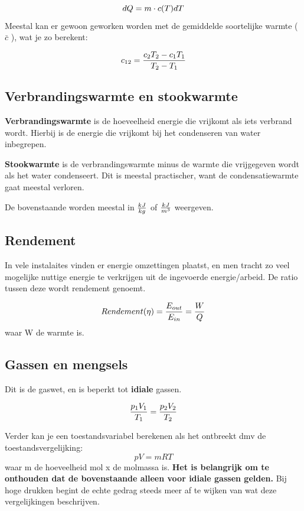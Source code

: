 \documentclass[12pt]{extarticle} %
\begin{document}
\begin{equation}\label{eq:warmte DE}
    dQ = m \cdot c(T) dT \\
    \end{equation}
Meestal kan er gewoon geworken worden met de gemiddelde soortelijke warmte ( $\bar{c}$ ), wat je zo berekent:

\begin{equation}\label{avg. soortelijke warmte}
    c_{12} = {c_2T_2 - c_1T_1 \over T_2 - T_1}
\end{equation}

\subsection{ Verbrandingswarmte en stookwarmte}

\textbf{Verbrandingswarmte} is de hoeveelheid energie die vrijkomt als iets verbrand wordt. Hierbij is de energie die vrijkomt bij het condenseren van water inbegrepen.

\textbf{Stookwarmte} is de verbrandingswarmte minus de warmte die vrijgegeven wordt als het water condenseert. Dit is meestal practischer, want de condensatiewarmte
gaat meestal verloren.

De bovenstaande worden meestal in ${kJ \over kg}$ of $kJ \over m^3$ weergeven.


\subsection{Rendement}
In vele instalaites vinden er energie omzettingen plaatst, en men tracht zo veel mogelijke nuttige energie te verkrijgen 
uit de ingevoerde energie/arbeid. De ratio tussen deze wordt rendement genoemt.

\begin{equation*}
    Rendement(\eta) = {E_{out} \over E_{in}} = {W\over Q}
\end{equation*}
waar W de warmte is.

\subsection{Gassen en mengsels}
Dit is de gaswet, en is beperkt tot \textbf{idiale} gassen. 

\begin{equation}
    {p_1 V_1 \over T_1} = {p_2 V_2 \over T_2}
\end{equation}

Verder kan je een toestandsvariabel berekenen als het ontbreekt dmv de toestandsvergelijking:
\begin{equation}\label{toestandsvergelijking}
    p V = m R T 
\end{equation}
waar m de hoeveelheid mol x de molmassa is. 
\textbf{Het is belangrijk om te onthouden dat de bovenstaande alleen voor idiale gassen gelden.} Bij hoge drukken begint de echte
gedrag steeds meer af te wijken van wat deze vergelijkingen beschrijven.
\end{document}
